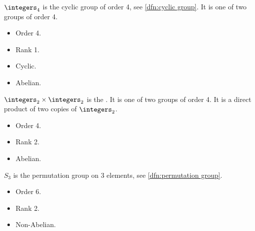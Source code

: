 \begin{dfn}{}{}
    \(\integers_4\) is the cyclic group of order 4, see \cref{dfn:cyclic group}.
    It is one of two groups of order 4.
    
    \begin{multicols}{2}
        \begin{itemize}
            \item  Order 4.
            \item Rank 1.
            \item Cyclic.
            \item Abelian.
        \end{itemize}
    \end{multicols}
\end{dfn}

\begin{dfn}{}{}
    \(\integers_2\times\integers_2\) is the .
    It is one of two groups of order 4.
    It is a direct product of two copies of \(\integers_2\).
    
    \begin{multicols}{2}
        \begin{itemize}
            \item Order 4.
            \item Rank 2.
            \item Abelian.
        \end{itemize}
    \end{multicols}
\end{dfn}

\begin{dfn}{}{}
    \(S_3\) is the permutation group on 3 elements, see \cref{dfn:permutation group}.
    
    \begin{multicols}{2}
        \begin{itemize}
            \item Order 6.
            \item Rank 2.
            \item Non-Abelian.
        \end{itemize}
    \end{multicols}
\end{dfn}

